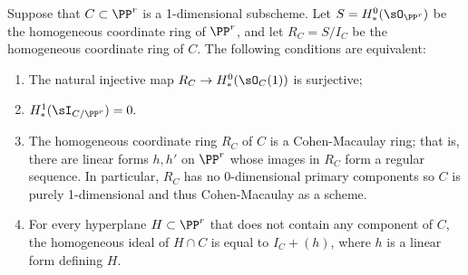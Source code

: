 \begin{proposition}\label{ACM basics}
Suppose that $C\subset \PP^r$ is a 1-dimensional subscheme. Let $S = H^0_*(\sO_{\PP^r})$
be the homogeneous coordinate ring of $\PP^r$, and let $R_C = S/I_C$ be the homogeneous
coordinate ring of $C$. The following conditions are equivalent:
\begin{enumerate}

 \item The natural injective map $R_C \to H^0_*(\sO_{C}(1))$ is surjective;
 
\item $H^1_*(\sI_{C/\PP^r}) = 0.$

\item The homogeneous coordinate ring $R_C$ of $C$ is a Cohen-Macaulay ring; that is, there are linear forms $h,h'$ on $\PP^r$ whose images in  $R_C$ form a regular sequence. In particular, $R_C$ has no 0-dimensional primary components
so $C$ is purely 1-dimensional and thus Cohen-Macaulay as a scheme.

 \item For every hyperplane $H\subset \PP^r$ that does not contain any component of $C$,
 the homogeneous ideal of $H\cap C$
 is equal to  $I_C+(h)$, where $h$ is a linear form defining $H$.
 
\end{enumerate}
\end{proposition}
 

